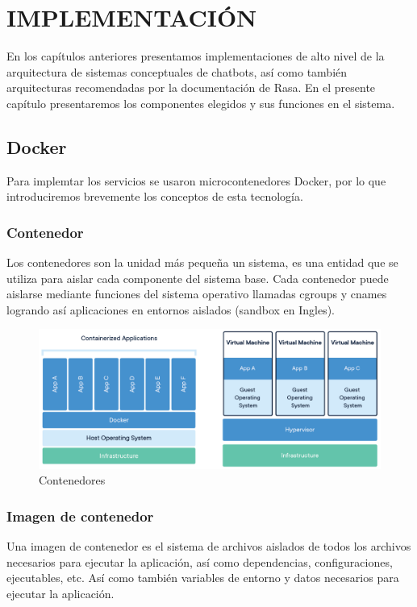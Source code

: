 \chapter[IMPLEMENTACION]{IMPLEMENTACIÓN}
En los capítulos anteriores presentamos implementaciones de alto nivel de la arquitectura de
sistemas conceptuales de chatbots, así como también arquitecturas recomendadas por la documentación
de Rasa. En el presente capítulo presentaremos los componentes elegidos y sus funciones en el
sistema.

\section{Docker}

Para implemtar los servicios se usaron microcontenedores Docker, por lo que introduciremos
brevemente los conceptos de esta tecnología.

\subsection{Contenedor}

Los contenedores son la unidad más pequeña un sistema, es una entidad que se utiliza para aislar
cada componente del sistema base. Cada contenedor puede aislarse mediante funciones del sistema
operativo llamadas cgroups y cnames logrando así aplicaciones en entornos aislados (sandbox en
Ingles). \cite{Docker}

\begin{figure}[ht]
	\centering
	\includegraphics[width=\textwidth]{imagenes/cap4/docker-container.png}
	\caption{Contenedores}
	\label{fig:container_diagram}
\end{figure}

\subsection{Imagen de contenedor}

Una imagen de contenedor es el sistema de archivos aislados de todos los archivos necesarios para
ejecutar la aplicación, así como dependencias, configuraciones, ejecutables, etc. Así como también
variables de entorno y datos necesarios para ejecutar la aplicación. \cite{Docker}

